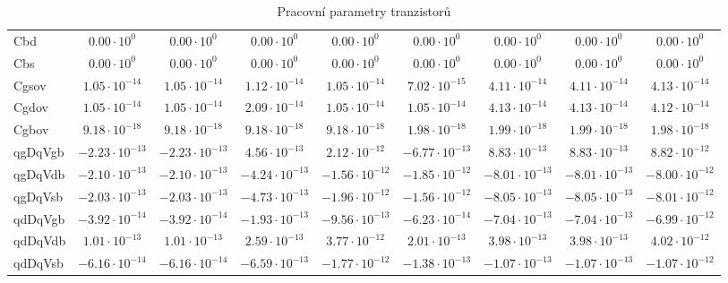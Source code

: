 \begin{table}[h!]
\begin{tabular}{lcccccccc}
        Cbd & \(0.00\cdot10^{0}\) & \(0.00\cdot10^{0}\) & \(0.00\cdot10^{0}\) & \(0.00\cdot10^{0}\) & \(0.00\cdot10^{0}\) & \(0.00\cdot10^{0}\) & \(0.00\cdot10^{0}\) & \(0.00\cdot10^{0}\) \\
        Cbs & \(0.00\cdot10^{0}\) & \(0.00\cdot10^{0}\) & \(0.00\cdot10^{0}\) & \(0.00\cdot10^{0}\) & \(0.00\cdot10^{0}\) & \(0.00\cdot10^{0}\) & \(0.00\cdot10^{0}\) & \(0.00\cdot10^{0}\) \\
        Cgsov & \(1.05\cdot10^{-14}\) & \(1.05\cdot10^{-14}\) & \(1.12\cdot10^{-14}\) & \(1.05\cdot10^{-14}\) & \(7.02\cdot10^{-15}\) & \(4.11\cdot10^{-14}\) & \(4.11\cdot10^{-14}\) & \(4.13\cdot10^{-14}\) \\
        Cgdov & \(1.05\cdot10^{-14}\) & \(1.05\cdot10^{-14}\) & \(2.09\cdot10^{-14}\) & \(1.05\cdot10^{-14}\) & \(1.05\cdot10^{-14}\) & \(4.13\cdot10^{-14}\) & \(4.13\cdot10^{-14}\) & \(4.12\cdot10^{-14}\) \\
        Cgbov & \(9.18\cdot10^{-18}\) & \(9.18\cdot10^{-18}\) & \(9.18\cdot10^{-18}\) & \(9.18\cdot10^{-18}\) & \(1.98\cdot10^{-18}\) & \(1.99\cdot10^{-18}\) & \(1.99\cdot10^{-18}\) & \(1.98\cdot10^{-18}\) \\
        qgDqVgb & \(-2.23\cdot10^{-13}\) & \(-2.23\cdot10^{-13}\) & \(4.56\cdot10^{-13}\) & \(2.12\cdot10^{-12}\) & \(-6.77\cdot10^{-13}\) & \(8.83\cdot10^{-13}\) & \(8.83\cdot10^{-13}\) & \(8.82\cdot10^{-12}\) \\
        qgDqVdb & \(-2.10\cdot10^{-13}\) & \(-2.10\cdot10^{-13}\) & \(-4.24\cdot10^{-13}\) & \(-1.56\cdot10^{-12}\) & \(-1.85\cdot10^{-12}\) & \(-8.01\cdot10^{-13}\) & \(-8.01\cdot10^{-13}\) & \(-8.00\cdot10^{-12}\) \\
        qgDqVsb & \(-2.03\cdot10^{-13}\) & \(-2.03\cdot10^{-13}\) & \(-4.73\cdot10^{-13}\) & \(-1.96\cdot10^{-12}\) & \(-1.56\cdot10^{-12}\) & \(-8.05\cdot10^{-13}\) & \(-8.05\cdot10^{-13}\) & \(-8.01\cdot10^{-12}\) \\
        qdDqVgb & \(-3.92\cdot10^{-14}\) & \(-3.92\cdot10^{-14}\) & \(-1.93\cdot10^{-13}\) & \(-9.56\cdot10^{-13}\) & \(-6.23\cdot10^{-14}\) & \(-7.04\cdot10^{-13}\) & \(-7.04\cdot10^{-13}\) & \(-6.99\cdot10^{-12}\) \\
        qdDqVdb & \(1.01\cdot10^{-13}\) & \(1.01\cdot10^{-13}\) & \(2.59\cdot10^{-13}\) & \(3.77\cdot10^{-12}\) & \(2.01\cdot10^{-13}\) & \(3.98\cdot10^{-13}\) & \(3.98\cdot10^{-13}\) & \(4.02\cdot10^{-12}\) \\
        qdDqVsb & \(-6.16\cdot10^{-14}\) & \(-6.16\cdot10^{-14}\) & \(-6.59\cdot10^{-13}\) & \(-1.77\cdot10^{-12}\) & \(-1.38\cdot10^{-13}\) & \(-1.07\cdot10^{-13}\) & \(-1.07\cdot10^{-13}\) & \(-1.07\cdot10^{-12}\) \\
        \hline
    \end{tabular}
    \caption{Pracovní parametry tranzistorů}
\end{table}


